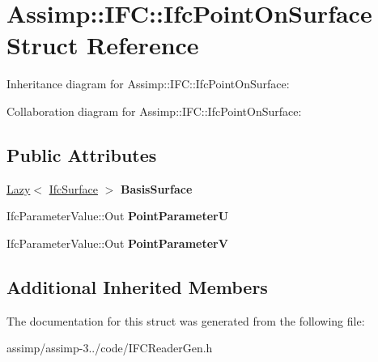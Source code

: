\hypertarget{struct_assimp_1_1_i_f_c_1_1_ifc_point_on_surface}{\section{Assimp\+:\+:I\+F\+C\+:\+:Ifc\+Point\+On\+Surface Struct Reference}
\label{struct_assimp_1_1_i_f_c_1_1_ifc_point_on_surface}
}


Inheritance diagram for Assimp\+:\+:I\+F\+C\+:\+:Ifc\+Point\+On\+Surface\+:


Collaboration diagram for Assimp\+:\+:I\+F\+C\+:\+:Ifc\+Point\+On\+Surface\+:
\subsection*{Public Attributes}
\begin{DoxyCompactItemize}
\item 
\hypertarget{struct_assimp_1_1_i_f_c_1_1_ifc_point_on_surface_a33ac0fe08a2fc92be95df24e344bd322}{\hyperlink{struct_assimp_1_1_s_t_e_p_1_1_lazy}{Lazy}$<$ \hyperlink{struct_assimp_1_1_i_f_c_1_1_ifc_surface}{Ifc\+Surface} $>$ {\bfseries Basis\+Surface}}\label{struct_assimp_1_1_i_f_c_1_1_ifc_point_on_surface_a33ac0fe08a2fc92be95df24e344bd322}

\item 
\hypertarget{struct_assimp_1_1_i_f_c_1_1_ifc_point_on_surface_a2cd21b23aadcbe17c6b6a243080015f5}{Ifc\+Parameter\+Value\+::\+Out {\bfseries Point\+Parameter\+U}}\label{struct_assimp_1_1_i_f_c_1_1_ifc_point_on_surface_a2cd21b23aadcbe17c6b6a243080015f5}

\item 
\hypertarget{struct_assimp_1_1_i_f_c_1_1_ifc_point_on_surface_a0563ab93417e048499f5e86dcd1b4b56}{Ifc\+Parameter\+Value\+::\+Out {\bfseries Point\+Parameter\+V}}\label{struct_assimp_1_1_i_f_c_1_1_ifc_point_on_surface_a0563ab93417e048499f5e86dcd1b4b56}

\end{DoxyCompactItemize}
\subsection*{Additional Inherited Members}


The documentation for this struct was generated from the following file\+:\begin{DoxyCompactItemize}
\item 
assimp/assimp-\/3../code/I\+F\+C\+Reader\+Gen.\+h\end{DoxyCompactItemize}
